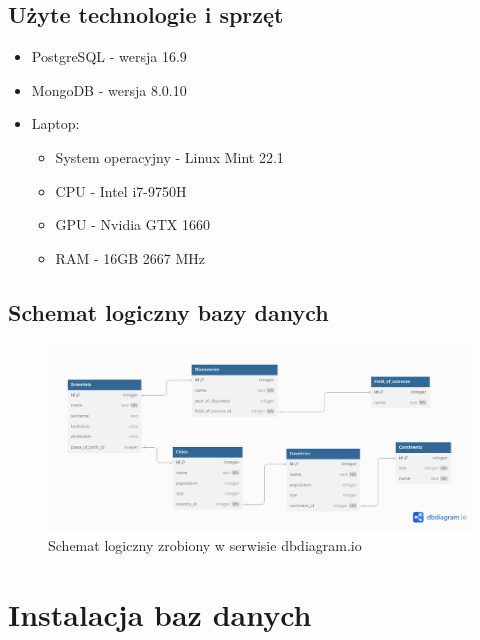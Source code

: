 \documentclass[11pt]{article}
\begin{document}
	\subsection{Użyte technologie i sprzęt}
		\begin{itemize}
			\item PostgreSQL - wersja 16.9
			\item MongoDB - wersja 8.0.10
			\item Laptop:
			\begin{itemize}
				\item System operacyjny - Linux Mint 22.1
				\item CPU - Intel i7-9750H
				\item GPU - Nvidia GTX 1660
				\item RAM - 16GB 2667 MHz		
			\end{itemize}
		\end{itemize}
	
\newpage
	\subsection{Schemat logiczny bazy danych}
		\begin{figure}[h]
			\includegraphics[width=\textwidth]{db-bench.png}
			\caption{Schemat logiczny zrobiony w serwisie dbdiagram.io}
		\end{figure}
\section{Instalacja baz danych}
\end{document}
